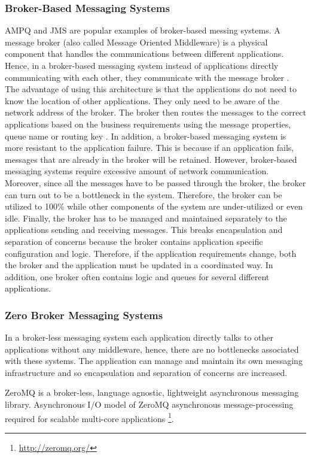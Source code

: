 \documentclass[a4paper,11pt,twoside]{article}
\begin{document}
\subsubsection{Broker-Based Messaging Systems} 
AMPQ and JMS are popular examples of broker-based messing systems. A message broker (also called Message Oriented Middleware) is a physical component that handles the communications between different applications. Hence, in a broker-based messaging system instead of applications directly communicating with each other, they communicate with the message broker \cite{broker}. The advantage of using this architecture is that the applications do not need to know the location of other applications. They only need to be aware of the network address of the broker. The broker then routes the messages to the correct applications based on the business requirements using the message properties, queue name or routing key \cite{AMPQ}. In addition, a broker-based messaging system is more resistant to the application failure. This is because if an application fails, messages that are already in the broker will be retained. However, broker-based messaging systems require excessive amount of network communication. Moreover, since all the messages have to be passed through the broker, the broker can turn out to be a bottleneck in the system. Therefore, the broker can be utilized to 100\% while other components of the system are under-utilized or even idle. Finally, the broker has to be managed and maintained separately to the applications sending and receiving messages. This breaks encapsulation and separation of concerns because the broker contains application specific configuration and logic. Therefore, if the application requirements change, both the broker and the application must be updated in a coordinated way. In addition, one broker often contains logic and queues for several different applications.

\subsubsection{Zero Broker Messaging Systems} 
In a broker-less messaging system each application directly talks to other applications without any middleware, hence, there are no bottlenecks associated with these systems. The application can manage and maintain its own messaging infrastructure and so encapsulation and separation of concerns are increased.

ZeroMQ is a broker-less, language agnostic, lightweight asynchronous messaging library. Asynchronous I/O model of ZeroMQ asynchronous message-processing required for scalable multi-core applications \footnote{\label{ZeroMQ_2} \url{http://zeromq.org/}}. 
\end{document}
